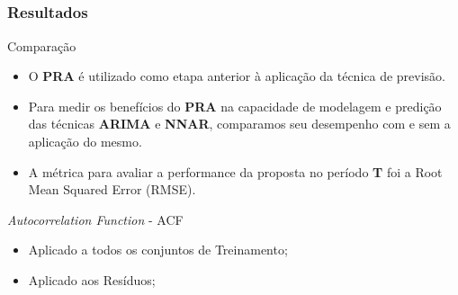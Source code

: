 \documentclass[aspectratio=169]{beamer}
\begin{document}
\subsection{}
\begin{frame}
\frametitle{Resultados}

\begin{block}{Comparação}
\begin{itemize} \small
    \item O \textbf{PRA} é utilizado como etapa anterior à aplicação da técnica de previsão.
    \item Para medir os benefícios do \textbf{PRA} na capacidade de modelagem e predição das técnicas \textbf{ARIMA} e \textbf{NNAR}, comparamos seu desempenho com e sem a aplicação do mesmo.
    \item A métrica para avaliar a performance da proposta no período \textbf{T} foi a Root Mean Squared Error (RMSE).
\end{itemize}
\end{block}

\begin{block}{\textit{Autocorrelation Function} -
ACF}
\begin{itemize} \small
    \item Aplicado a todos os conjuntos de Treinamento;
    \item Aplicado aos Resíduos;
\end{itemize}
\end{block}
 
\end{frame}

\end{document}
